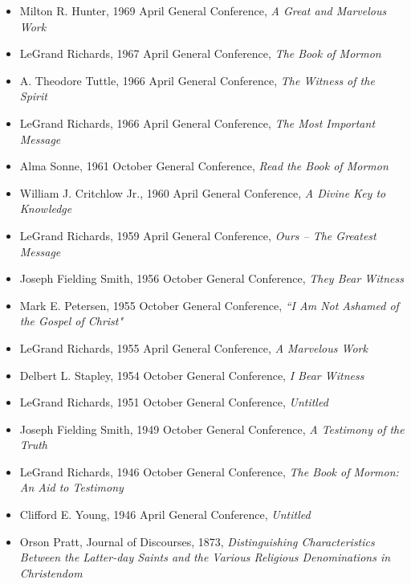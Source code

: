 \documentclass[12pt]{report}
\begin{document}
\begin{itemize}
\item Milton R. Hunter, 1969 April General Conference, \emph{A Great and Marvelous Work}
\item LeGrand Richards, 1967 April General Conference, \emph{The Book of Mormon}
\item A. Theodore Tuttle, 1966 April General Conference, \emph{The Witness of the Spirit}
\item LeGrand Richards, 1966 April General Conference, \emph{The Most Important Message}
\item Alma Sonne, 1961 October General Conference, \emph{Read the Book of Mormon}
\item William J. Critchlow Jr., 1960 April General Conference, \emph{A Divine Key to Knowledge}
\item LeGrand Richards, 1959 April General Conference, \emph{Ours -- The Greatest Message}
\item Joseph Fielding Smith, 1956 October General Conference, \emph{They Bear Witness}
\item Mark E. Petersen, 1955 October General Conference, \emph{``I Am Not Ashamed of the Gospel of Christ"}
\item LeGrand Richards, 1955 April General Conference, \emph{A Marvelous Work}
\item Delbert L. Stapley, 1954 October General Conference, \emph{I Bear Witness}
\item LeGrand Richards, 1951 October General Conference, \emph{Untitled}
\item Joseph Fielding Smith, 1949 October General Conference, \emph{A Testimony of the Truth}
\item LeGrand Richards, 1946 October General Conference, \emph{The Book of Mormon: An Aid to Testimony}
\item Clifford E. Young, 1946 April General Conference, \emph{Untitled}
\item Orson Pratt, Journal of Discourses, 1873, \emph{Distinguishing Characteristics Between the Latter-day Saints and the Various Religious Denominations in Christendom}
\end{itemize}

\end{document}
